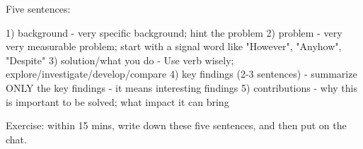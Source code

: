 
\setlength{\parindent}{0pt}
\setlength{\parskip}{1em}
\setlength{\baselineskip}{1.5em}

\begin{center}
  \fontsize{14}{17}
\end{center}
\vspace{2em}

Five sentences:

1)  background
    - very specific background; hint the problem
2)  problem
    - very very measurable problem; start with a signal word like "However", "Anyhow", "Despite"
3)  solution/what you do
    - Use verb wisely; explore/investigate/develop/compare
4)  key findings (2-3 sentences)
    - summarize ONLY the key findings - it means interesting findings
5)  contributions
    - why this is important to be solved; what impact it can bring
    
Exercise: within 15 mins, write down these five sentences, and then put on the chat.

